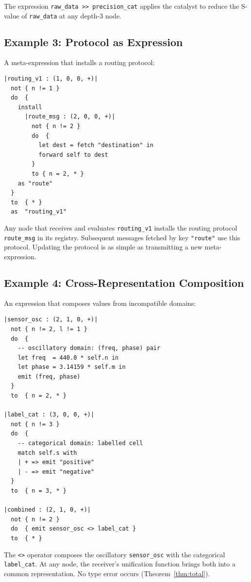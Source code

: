 \documentclass[twocolumn,11pt,a4paper]{article}
\theoremstyle{definition}
\theoremstyle{remark}
\begin{document}
The expression \lstinline|raw_data >> precision_cat| applies the
catalyst to reduce the S-value of \lstinline|raw_data| at any depth-3
node.

\subsection{Example 3: Protocol as Expression}

A meta-expression that installs a routing protocol:

\begin{lstlisting}[caption={Protocol meta-expression}, label={lst:ex3}]
|routing_v1 : (1, 0, 0, +)|
  not { n != 1 }
  do  {
    install
      |route_msg : (2, 0, 0, +)|
        not { n != 2 }
        do  {
          let dest = fetch "destination" in
          forward self to dest
        }
        to { n = 2, * }
    as "route"
  }
  to  { * }
  as  "routing_v1"
\end{lstlisting}

Any node that receives and evaluates \lstinline|routing_v1| installs
the routing protocol \lstinline|route_msg| in its registry.  Subsequent
messages fetched by key \lstinline|"route"| use this protocol.  Updating
the protocol is as simple as transmitting a new meta-expression.

\subsection{Example 4: Cross-Representation Composition}

An expression that composes values from incompatible domains:

\begin{lstlisting}[caption={Cross-representation composition}, label={lst:ex4}]
|sensor_osc : (2, 1, 0, +)|
  not { n != 2, l != 1 }
  do  {
    -- oscillatory domain: (freq, phase) pair
    let freq  = 440.0 * self.n in
    let phase = 3.14159 * self.m in
    emit (freq, phase)
  }
  to  { n = 2, * }

|label_cat : (3, 0, 0, +)|
  not { n != 3 }
  do  {
    -- categorical domain: labelled cell
    match self.s with
    | + => emit "positive"
    | - => emit "negative"
  }
  to  { n = 3, * }

|combined : (2, 1, 0, +)|
  not { n != 2 }
  do  { emit sensor_osc <> label_cat }
  to  { * }
\end{lstlisting}

The \lstinline|<>| operator composes the oscillatory
\lstinline|sensor_osc| with the categorical \lstinline|label_cat|.
At any node, the receiver's unification function brings both into
a common representation.  No type error occurs
(Theorem~\ref{thm:total}).
\end{document}
